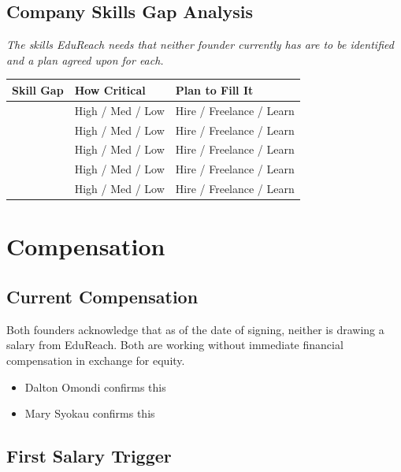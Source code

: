 \documentclass[12pt,a4paper]{article}
\newcommand{\blank}[1][5.5cm]{\underline{\hspace{#1}}}
\newcommand{\cb}{$\square$\;}                   %
\begin{document}
\subsection{Company Skills Gap Analysis}

\begin{notebox}
\textit{The skills EduReach needs that neither founder currently has are to be identified and a plan agreed upon for each.}
\end{notebox}

\begin{tabularx}{\linewidth}{X C{3cm} C{4cm}}
  \toprule
  \textbf{Skill Gap} & \textbf{How Critical} & \textbf{Plan to Fill It} \\
  \midrule
  \blank[6cm] & High / Med / Low & Hire / Freelance / Learn \\[0.4em]
  \blank[6cm] & High / Med / Low & Hire / Freelance / Learn \\[0.4em]
  \blank[6cm] & High / Med / Low & Hire / Freelance / Learn \\[0.4em]
  \blank[6cm] & High / Med / Low & Hire / Freelance / Learn \\[0.4em]
  \blank[6cm] & High / Med / Low & Hire / Freelance / Learn \\
  \bottomrule
\end{tabularx}

\section{Compensation}

\subsection{Current Compensation}

Both founders acknowledge that as of the date of signing, neither is drawing a salary from EduReach. Both are working without immediate financial compensation in exchange for equity.

\begin{itemize}[label=\cb]
  \item Dalton Omondi confirms this
  \item Mary Syokau confirms this
\end{itemize}

\subsection{First Salary Trigger}
\end{document}
